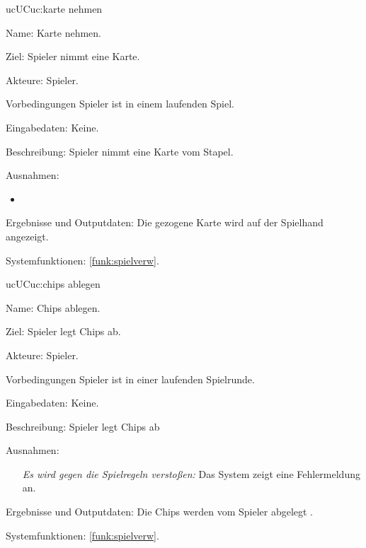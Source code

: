 \begin{description}[leftmargin=5em, style=sameline]
	\begin{lhp}{uc}{UC}{uc:karte nehmen}
		\item [Name:] Karte nehmen.
		\item [Ziel:] Spieler nimmt eine Karte.
		\item [Akteure:] Spieler.
		\item [Vorbedingungen] Spieler ist in einem laufenden Spiel.
		\item [Eingabedaten:] Keine.
		\item [Beschreibung:] Spieler nimmt eine Karte vom Stapel.
		\item [Ausnahmen:] \hfill
		\begin{itemize} 
			\item
		\end{itemize}
		\item [Ergebnisse und Outputdaten:] Die gezogene Karte wird auf der Spielhand  angezeigt.
		\item [Systemfunktionen:] \ref{funk:spielverw}.
	\end{lhp}

	\begin{lhp}{uc}{UC}{uc:chips ablegen}
		\item [Name:] Chips ablegen.
		\item [Ziel:] Spieler legt Chips ab.
		\item [Akteure:] Spieler.
		\item [Vorbedingungen] Spieler ist in einer laufenden Spielrunde.
		\item [Eingabedaten:] Keine.
		\item [Beschreibung:] Spieler legt Chips ab
		\item [Ausnahmen:] \hfill
		\begin{itemize} 
			\item[] \textit{Es wird gegen die Spielregeln verstoßen:} Das System zeigt eine Fehlermeldung an.
			
		\end{itemize}
		\item [Ergebnisse und Outputdaten:] Die Chips werden vom Spieler abgelegt .
		\item [Systemfunktionen:] \ref{funk:spielverw}.
	\end{lhp}



\end{description}
